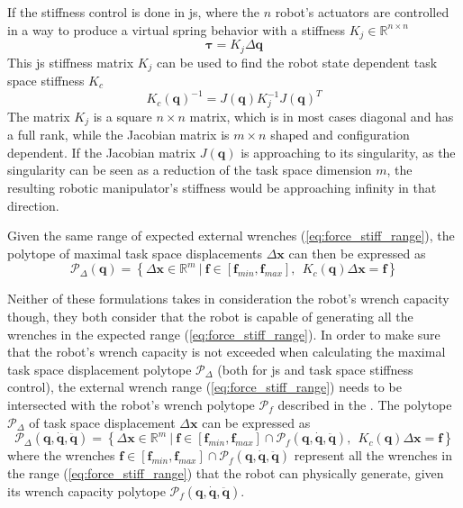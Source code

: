 If the stiffness control is done in \gls{js}, where the $n$ robot's actuators are controlled in a way to produce a virtual spring behavior with a stiffness $K_j\in \mathbb{R}^{n\times n}$
\begin{equation}
    \bm{\tau} = K_j \Delta\bm{q}
\end{equation}
This \gls{js} stiffness matrix $K_j$ can be used to find the robot state dependent task space stiffness $K_c$ \cite{Salisbury1980}
\begin{equation}
     K_c(\bm{q})^{-1} = J(\bm{q}) K_j^{-1}J(\bm{q})^T
     \label{eq:stiffness_roobt_eef}
\end{equation}
The matrix $K_j$ is a square $n \times n$ matrix, which is in most cases diagonal and has a full rank, while the Jacobian matrix is $m\times n$ shaped and configuration dependent. If the Jacobian matrix $J(\bm{q})$ is approaching to its singularity, as the singularity can be seen as a reduction of the task space dimension $m$, the resulting robotic manipulator's stiffness would be approaching infinity in that direction. 

Given the same range of expected external wrenches (\ref{eq:force_stiff_range}), the polytope of maximal task space displacements $\Delta\bm{x}$ can then be expressed as
\begin{equation}
    \mathcal{P}_\Delta(\bm{q}) = \left\{ \Delta\bm{x} \in \mathbb{R}^m ~|~ \bm{f}\in\left[\bm{f}_{min}, \bm{f}_{max} \right], ~~ K_c(\bm{q})\Delta\bm{x} = \bm{f} \right\}
\end{equation}


Neither of these formulations takes in consideration the robot's wrench capacity though, they both consider that the robot is capable of generating all the wrenches in the expected range (\ref{eq:force_stiff_range}). 
In order to make sure that the robot's wrench capacity is not exceeded when calculating the maximal task space displacement polytope $\mathcal{P}_\Delta$ (both for \gls{js} and task space stiffness control), the external wrench range (\ref{eq:force_stiff_range}) needs to be intersected with the robot's wrench polytope  $\mathcal{P}_f$ described in the . The polytope $\mathcal{P}_\Delta$ of task space displacement $\Delta \bm{x}$ can be expressed as
\begin{equation}
    \mathcal{P}_\Delta(\bm{q},\dot{\bm{q}},\ddot{\bm{q}}) = \left\{ \Delta\bm{x} \in \mathbb{R}^m ~|~ \bm{f}\in \left[\bm{f}_{min}, \bm{f}_{max} \right] \cap \mathcal{P}_f(\bm{q},\dot{\bm{q}},\ddot{\bm{q}}),  ~~  K_c(\bm{q})\Delta\bm{x}=\bm{f}\right\}
\end{equation}
where the wrenches $\bm{f}\in \left[\bm{f}_{min}, \bm{f}_{max} \right] \cap \mathcal{P}_f(\bm{q},\dot{\bm{q}},\ddot{\bm{q}})$ represent all the wrenches in the range (\ref{eq:force_stiff_range}) that the robot can physically generate, given its wrench capacity polytope $\mathcal{P}_f(\bm{q},\dot{\bm{q}},\ddot{\bm{q}})$.

